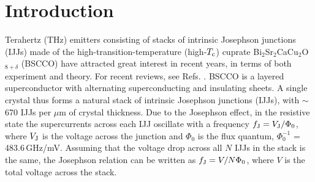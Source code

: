 \documentclass[aps,twocolumn,prb,showpacs,preprintnumbers,superscriptaddress,amsmath,amssymb,longbibliography]{revtex4-1}
\begin{document}
\section{Introduction}
\label{sec:intro}
Terahertz (THz) emitters consisting of stacks of intrinsic Josephson junctions (IJJs) made of the high-transition-temperature (high-$T_{\rm c}$) cuprate Bi$_{2}$Sr$_{2}$CaCu$_{2}$O$_{8+\delta}$ (BSCCO) have attracted great interest in recent years, in terms of both experiment\cite{Ozyuzer07,Kadowaki08,Wang09a,Minami09,Gray09,Guenon10,Kurter10,Wang10a,Tsujimoto10,Koseoglu11,Benseman11,Yamaki11,
Yuan12,Li12,Kakeya12,Kashiwagi12,Tsujimoto12,Tsujimoto12a,Turkoglu12,An13,Benseman13,Benseman13a,Sekimoto13,Minami14,Watanabe14,Ji14,
Tsujimoto14,Kashiwagi14,Kashiwagi14b,Kashiwagi15a,Kashiwagi15b,Kitamura14,Watanabe15,Zhou15a,Zhou15b,Hao15,Kashiwagi15c,Benseman15,Nakade16,Tsujimoto16,Sun17,Kizilaslan17, Tsujimoto17,Huang17, Elarabi17, Borodianskyi17, Elarabi18, Kashiwagi18, Uchida18} and theory\cite{Bulaevskii07,Koshelev08b,Lin08,Hu08,Krasnov09,Klemm09,Tachiki09,Pedersen09,Hu09,Koyama09,Krasnov10,Koshelev10,Kadowaki10,Yurgens11, Krasnov11,Tachiki11,Klemm11,Lin12,Averkov12,Asai12,Grib12,Gross12,Gross13,Liu13,Asai14,Grib14,Rudau15, Rudau16, Asai17,Cerkoney17, Klemm17, Klemm17b, Sun18}. 
For recent reviews, see Refs. .
BSCCO is a layered superconductor with alternating superconducting and insulating sheets. A single crystal thus forms a natural stack of intrinsic Josephson junctions (IJJs), with $\sim$670 IJJs per $\mu$m of crystal thickness\cite{Kleiner92}. 
Due to the Josephson effect, in the resistive state the supercurrents across each IJJ oscillate with a frequency $f_{\rm J} = V_{\rm J}/\Phi_0$, where $V_{\rm J}$ is the voltage across the junction and $\Phi_0$ is the flux quantum, $\Phi_0^{-1}$ = 483.6\,GHz/mV. Assuming that the voltage drop across all $N$ IJJs in the stack is the same, the Josephson relation can be written as  $f_{\rm J} = V/N\Phi_0$, where $V$ is the total voltage across the stack. 
\end{document}
